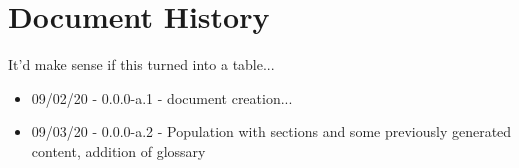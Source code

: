 \chapter{Document History}
It'd make sense if this turned into a table...

\begin{itemize}
\item 09/02/20 -  0.0.0-a.1 - document creation...
\item 09/03/20 -  0.0.0-a.2 - Population with sections and some previously generated content, addition of glossary
\end{itemize}